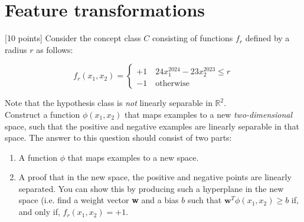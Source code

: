 \section{Feature transformations}\label{sec:q2}

[10 points] Consider the concept class $C$ consisting of functions $f_r$ defined by a radius $r$ as follows:

\begin{equation*}
            f_r(x_1,x_2) = \begin{cases}
                +1 \quad 24x_1^{2024}-23x_2^{2023}\leq r \\
                -1 \quad \text{otherwise}
            \end{cases}
            \label{eq-0}
        \end{equation*}

Note that the hypothesis class is \textit{not} linearly separable in $\mathbb{R}^2$.\\

Construct a function $\phi(x_1,x_2)$ that maps examples to a new \emph{two-dimensional} space, such that the positive and negative examples are linearly separable in that space. The answer to this question should consist of two parts: 
\begin{enumerate}
\item A function $\phi$ that maps examples to a new space.
\item A proof that in the new space, the positive and negative points are linearly separated. You can show this by producing such a hyperplane in the new space (i.e. find a weight vector \textbf{w} and a bias $b$ such that $\textbf{w}^T\phi(x_1,x_2)\geq b$ if, and only if, $f_r(x_1,x_2)=+1$.
\end{enumerate}

